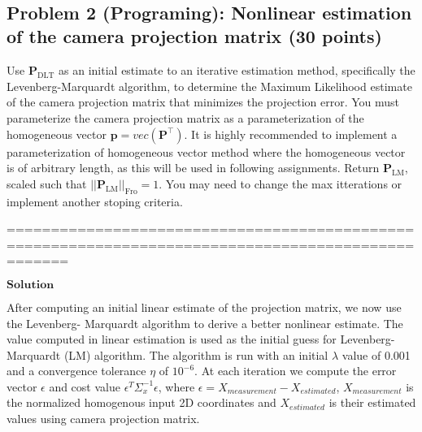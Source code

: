 \documentclass[11pt]{article}
\begin{document}
    \begin{center}
    \end{center}
    { \hspace*{\fill} \\}
    
    \subsection{Problem 2 (Programing): Nonlinear estimation of the camera
projection matrix (30
points)}\label{problem-2-programing-nonlinear-estimation-of-the-camera-projection-matrix-30-points}

Use \(\boldsymbol{P}_\text{DLT}\) as an initial estimate to an iterative
estimation method, specifically the Levenberg-Marquardt algorithm, to
determine the Maximum Likelihood estimate of the camera projection
matrix that minimizes the projection error. You must parameterize the
camera projection matrix as a parameterization of the homogeneous vector
\(\boldsymbol{p} = vec{(\boldsymbol{P}^\top)}\). It is highly
recommended to implement a parameterization of homogeneous vector method
where the homogeneous vector is of arbitrary length, as this will be
used in following assignments. Return \(\boldsymbol{P}_\text{LM}\),
scaled such that \(||\boldsymbol{P}_\text{LM}||_\text{Fro} = 1\). You
may need to change the max itterations or implement another stoping
criteria.

===================================================================================================

\(\boldsymbol{Solution}\)

After computing an initial linear estimate of the projection matrix, we
now use the Levenberg- Marquardt algorithm to derive a better nonlinear
estimate. The value computed in linear estimation is used as the initial
guess for Levenberg-Marquardt (LM) algorithm. The algorithm is run with
an initial \(\lambda\) value of 0.001 and a convergence tolerance
\(\eta\) of \(10^{-6}\). At each iteration we compute the error vector
\(\epsilon\) and cost value \(\epsilon^{T}\Sigma_{x}^{-1}\epsilon\),
where \(\epsilon = X_{measurement} - X_{estimated}\),
\(X_{measurement}\) is the normalized homogenous input 2D coordinates
and \(X_{estimated}\) is their estimated values using camera projection
matrix.
\end{document}
